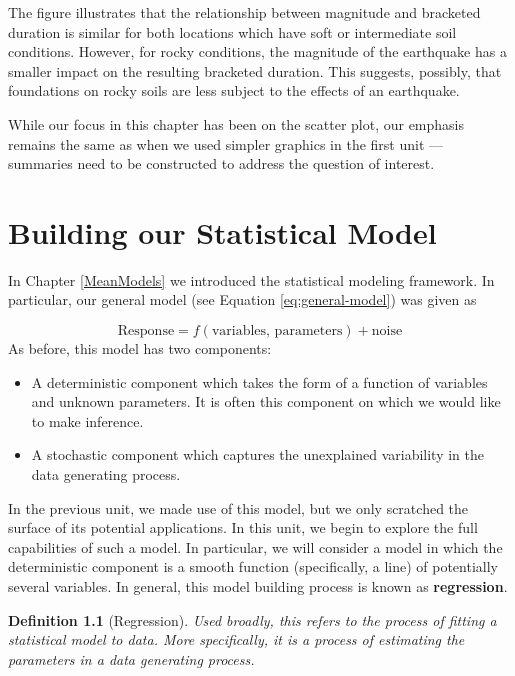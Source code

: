 \documentclass[
]{book}
\providecommand{\tightlist}{%
  \setlength{\itemsep}{0pt}\setlength{\parskip}{0pt}}
\theoremstyle{plain}
\theoremstyle{mydefn}
\newtheorem{definition}{Definition}[chapter]
\theoremstyle{myexmpl}
\theoremstyle{remark}
\begin{document}
The figure illustrates that the relationship between magnitude and bracketed duration is similar for both locations which have soft or intermediate soil conditions. However, for rocky conditions, the magnitude of the earthquake has a smaller impact on the resulting bracketed duration. This suggests, possibly, that foundations on rocky soils are less subject to the effects of an earthquake.

While our focus in this chapter has been on the scatter plot, our emphasis remains the same as when we used simpler graphics in the first unit --- summaries need to be constructed to address the question of interest.

\hypertarget{Regmodel}{%
\chapter{Building our Statistical Model}\label{Regmodel}}

In Chapter \ref{MeanModels} we introduced the statistical modeling framework. In particular, our general model (see Equation \eqref{eq:general-model}) was given as

\[\text{Response} = f(\text{variables, parameters}) + \text{noise}\]
As before, this model has two components:

\begin{itemize}
\tightlist
\item
  A deterministic component which takes the form of a function of variables and unknown parameters. It is often this component on which we would like to make inference.
\item
  A stochastic component which captures the unexplained variability in the data generating process.
\end{itemize}

In the previous unit, we made use of this model, but we only scratched the surface of its potential applications. In this unit, we begin to explore the full capabilities of such a model. In particular, we will consider a model in which the deterministic component is a smooth function (specifically, a line) of potentially several variables. In general, this model building process is known as \textbf{regression}.

\begin{definition}[Regression]
\protect\hypertarget{def:defn-regression}{}{\label{def:defn-regression} {} }Used broadly, this refers to the process of fitting a statistical model to data. More specifically, it is a process of estimating the parameters in a data generating process.
\end{definition}
\end{document}

